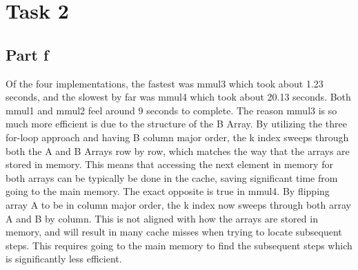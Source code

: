\documentclass[11pt, oneside]{article}   	%
\begin{document}
\section*{Task 2}
\subsection*{Part f}
Of the four implementations, the fastest was mmul3 which took about 1.23 seconds, and the slowest by far was mmul4 which took about 20.13 seconds.  Both mmul1 and mmul2 feel around 9 seconds to complete.  The reason mmul3 is so much more efficient is due to the structure of the B Array.  By utilizing the three for-loop approach and having B column major order, the k index sweeps through both the A and B Arrays row by row, which matches the way that the arrays are stored in memory.  This means that accessing the next element in memory for both arrays can be typically be done in the cache, saving significant time from going to the main memory.  The exact opposite is true in mmul4.  By flipping array A to be in column major order, the k index now sweeps through both array A and B by column.  This is not aligned with how the arrays are stored in memory, and will result in many cache misses when trying to locate subsequent steps.  This requires going to the main memory to find the subsequent steps which is significantly less efficient.
\end{document}
